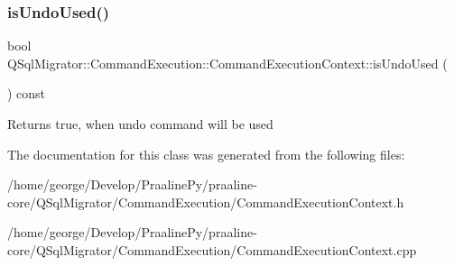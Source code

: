 \subsubsection{\texorpdfstring{is\+Undo\+Used()}{isUndoUsed()}}
{\footnotesize\ttfamily bool Q\+Sql\+Migrator\+::\+Command\+Execution\+::\+Command\+Execution\+Context\+::is\+Undo\+Used (\begin{DoxyParamCaption}{ }\end{DoxyParamCaption}) const}

\begin{DoxyReturn}{Returns}
true, when undo command will be used 
\end{DoxyReturn}


The documentation for this class was generated from the following files\+:\begin{DoxyCompactItemize}
\item 
/home/george/\+Develop/\+Praaline\+Py/praaline-\/core/\+Q\+Sql\+Migrator/\+Command\+Execution/Command\+Execution\+Context.\+h\item 
/home/george/\+Develop/\+Praaline\+Py/praaline-\/core/\+Q\+Sql\+Migrator/\+Command\+Execution/Command\+Execution\+Context.\+cpp\end{DoxyCompactItemize}
